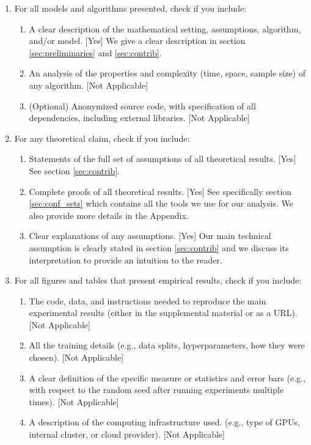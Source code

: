 \documentclass[twoside]{article}
\begin{document}
\begin{enumerate}

  \item For all models and algorithms presented, check if you include:
  \begin{enumerate}
    \item A clear description of the mathematical setting, assumptions, algorithm, and/or model. [Yes] We give a clear description in section \ref{sec:preliminaries} and \ref{sec:contrib}.
    \item An analysis of the properties and complexity (time, space, sample size) of any algorithm. 
    [Not Applicable] 
    \item (Optional) Anonymized source code, with specification of all dependencies, including external libraries. [Not Applicable]
  \end{enumerate}

  \item For any theoretical claim, check if you include:
  \begin{enumerate}
    \item Statements of the full set of assumptions of all theoretical results. [Yes] See section \ref{sec:contrib}.
    \item Complete proofs of all theoretical results. [Yes] See specifically section \ref{sec:conf_sets} which contains all the tools we use for our analysis. We also provide more details in the Appendix.
    \item Clear explanations of any assumptions. [Yes] Our main technical assumption is clearly stated in section \ref{sec:contrib} and we discuss its interpretation to provide an intuition to the reader.   
  \end{enumerate}

  \item For all figures and tables that present empirical results, check if you include:
  \begin{enumerate}
    \item The code, data, and instructions needed to reproduce the main experimental results (either in the supplemental material or as a URL). [Not Applicable]
    \item All the training details (e.g., data splits, hyperparameters, how they were chosen). [Not Applicable]
    \item A clear definition of the specific measure or statistics and error bars (e.g., with respect to the random seed after running experiments multiple times). [Not Applicable]
    \item A description of the computing infrastructure used. (e.g., type of GPUs, internal cluster, or cloud provider). [Not Applicable]
  \end{enumerate}


\end{enumerate}
\end{document}
